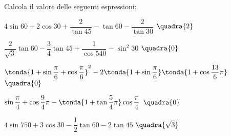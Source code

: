 \begin{esercizio}\label{ese:03.1}
Calcola il valore delle seguenti espressioni:
 \begin{enumeratea}
  \item  $4 \sin 60 + 2 \cos 30 + \dfrac{2}{\tan 45} - 
          \tan 60 - \dfrac{2}{\tan 30}$
   \hfill $\quadra{2}$
  \item  $\dfrac{2}{\sqrt{3}} \tan 60 - \dfrac{3}{4} \tan 45 + 
          \dfrac{1}{\cos 540} - \sin^2 30 $
   \hfill $\quadra{0}$
  \item  $\tonda{1 + \sin \dfrac{\pi}{6} + \cos \dfrac{\pi}{6}}^2 -
          2 \tonda{1 + \sin \dfrac{\pi}{6}} \tonda{1 + \cos \dfrac{13}{6}\pi}$
   \hfill $\quadra{0}$
  \item  $\sin \dfrac{\pi}{4} + \cos \dfrac{9}{4}\pi - 
          \tonda{1 + \tan \dfrac{5}{4}\pi} \cos \dfrac{\pi}{4}$
   \hfill $\quadra{0}$
  \item  $4 \sin 750 + 3 \cos 30 - \dfrac{1}{2} \tan 60 - 2 \tan 45$
   \hfill $\quadra{\sqrt{3}}$
 \end{enumeratea}
\end{esercizio}

\subsubsection*{}

